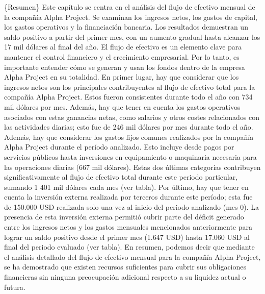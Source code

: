 \{Resumen\} Este capítulo se centra en el análisis del flujo de efectivo mensual de la compañía Alpha Project. Se examinan los ingresos netos, los gastos de capital, los gastos operativos y la financiación bancaria. Los resultados demuestran un saldo positivo a partir del primer mes, con un aumento gradual hasta alcanzar los 17 mil dólares al final del año.
El flujo de efectivo es un elemento clave para mantener el control financiero y el crecimiento empresarial. Por lo tanto, es importante entender cómo se generan y usan los fondos dentro de la empresa Alpha Project en su totalidad.
En primer lugar, hay que considerar que los ingresos netos son los principales contribuyentes al flujo de efectivo total para la compañía Alpha Project. Estos fueron consistentes durante todo el año con 734 mil dólares por mes. Además, hay que tener en cuenta los gastos operativos asociados con estas ganancias netas, como salarios y otros costes relacionados con las actividades diarias; esto fue de 246 mil dólares por mes durante todo el año.
Además, hay que considerar los gastos fijos comunes realizados por la compañía Alpha Project durante el período analizado. Esto incluye desde pagos por servicios públicos hasta inversiones en equipamiento o maquinaria necesaria para las operaciones diarias (667 mil dólares). Estas dos últimas categorías contribuyen significativamente al flujo de efectivo total durante este periodo particular, sumando 1 401 mil dólares cada mes (ver tabla).
Por último, hay que tener en cuenta la inversión externa realizada por terceros durante este período; esta fue de 150.000 USD realizada solo una vez al inicio del periodo analizado (mes 0). La presencia de esta inversión externa permitió cubrir parte del déficit generado entre los ingresos netos y los gastos mensuales mencionados anteriormente para lograr un saldo positivo desde el primer mes (1.647 USD) hasta 17.060 USD al final del periodo evaluado (ver tabla).
En resumen, podemos decir que mediante el análisis detallado del flujo de efectivo mensual para la compañía Alpha Project, se ha demostrado que existen recursos suficientes para cubrir sus obligaciones financieras sin ninguna preocupación adicional respecto a su liquidez actual o futura.
